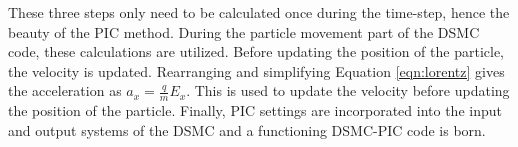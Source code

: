 \indent These three steps only need to be calculated once during the time-step, hence the beauty of the PIC method. During the particle movement part of the DSMC code, these calculations are utilized. Before updating the position of the particle, the velocity is updated. Rearranging and simplifying Equation \ref{eqn:lorentz} gives the acceleration as \(a_x = \frac{q}{m} E_x\). This is used to update the velocity before updating the position of the particle. Finally, PIC settings are incorporated into the input and output systems of the DSMC and a functioning DSMC-PIC code is born. 









